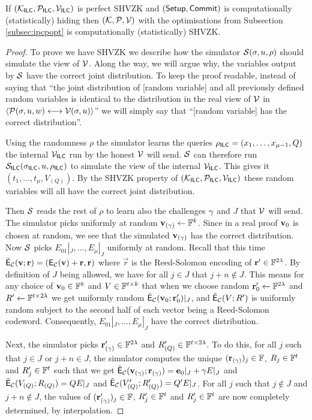\begin{theorem}[SHVZK]
If $(\mathcal{K}_{\mathsf{ILC}},\mathcal{P}_{\mathsf{ILC}},\mathcal{V}_{\mathsf{ILC}})$ is perfect SHVZK 
and $(\mathsf{Setup},\mathsf{Commit})$ is computationally (statistically) hiding then $(\mathcal{K},\mathcal{P},\mathcal{V})$ with the optimisations from Subsection \ref{subsec:ipcpopt} is computationally (statistically) SHVZK.
\end{theorem}
\begin{proof}
To prove we have SHVZK we describe how the simulator $\mathcal{S}(\mathsf{\sigma},u,\rho)$ should simulate the view of $\mathcal{V}$. Along the way, we will argue why, the variables output by $\mathcal{S}$ have the correct joint distribution. To keep the proof readable, instead of saying that ``the joint distribution of [random variable] and all previously defined random variables is identical to the distribution in the real view of $\mathcal{V}$ in $\langle \mathcal{P}(\mathsf{\sigma},u,w)\longleftrightarrow \mathcal{V}(\mathsf{\sigma},u)\rangle$'' we will simply say that ``[random variable] has the correct distribution''.

Using the randomness $\rho$ the simulator learns the queries $\rho_{\mathsf{ILC}}=(x_1,\ldots,x_{\mu-1},Q)$ the internal $\mathcal{V}_{\mathsf{ILC}}$ run by the honest $\mathcal{V}$ will send. $\mathcal{S}$ can therefore run $\mathcal{S}_{\mathsf{ILC}}(\mathsf{\sigma}_{\mathsf{ILC}},u,\rho_{\mathsf{ILC}})$ to simulate the view of the internal $\mathcal{V}_{\mathsf{ILC}}$. This gives it $(t_1,\ldots,t_\mu,V_{(Q)})$. By the SHVZK property of $(\mathcal{K}_{\mathsf{ILC}},\mathcal{P}_{\mathsf{ILC}},\mathcal{V}_{\mathsf{ILC}})$ these random variables will all have the correct joint distribution. 

Then $\mathcal{S}$ reads the rest of $\rho$ to learn also the challenges ${\mathbf{\gamma}}$ and $J$ that $\mathcal{V}$ will send. The simulator picks uniformly at random ${\mathbf{v}}_{(\mathbf{\gamma})}\gets \mathbb{F}^{k}$. Since in a real proof ${\mathbf{v}}_0$ is chosen at random, we see that the simulated ${\mathbf{v}}_{(\mathbf{\gamma})}$ has the correct distribution. Now $\mathcal{S}$ picks $E_{01}|_J,\ldots,E_{\mu}|_J$ uniformly at random. Recall that this time $\tilde{\mathsf{E}}_{\mathcal{C}}({\mathbf{v}};\mathbf{r})=(\mathsf{E}_{\mathcal{C}}({\mathbf{v}})+\mathbf{r},\mathbf{r})$ where $\vec{r}$ is the Reed-Solomon encoding of $\mathbf{r}' \in \mathbb{F}^{2\lambda}$. By definition of $J$ being allowed, we have for all $j\in J$ that $j+n\notin J$. This means for any choice of ${\mathbf{v}}_0\in \mathbb{F}^{k}$ and $V\in \mathbb{F}^{t\times k}$ that when we choose random $\mathbf{r}'_0\gets \mathbb{F}^{2\lambda}$ and $R' \gets \mathbb{F}^{t\times 2\lambda}$ we get uniformly random $\tilde{\mathsf{E}}_{\mathcal{C}}({\mathbf{v}}_0;\mathbf{r}'_0)|_J$, and $\tilde{\mathsf{E}}_{\mathcal{C}}(V;R')$ is uniformly random subject to the second half of each vector being a Reed-Solomon codeword. Consequently, $E_{01}|_J,\ldots,E_{\mu}|_J$ have the correct distribution.

Next, the simulator picks $\mathbf{r}'_{(\mathbf{\gamma})}\in \mathbb{F}^{2\lambda}$ and $R'_{(Q)}\in \mathbb{F}^{t\times 2\lambda}$. %
To do this, for all $j$ such that $j\in J$ or $j+n\in J$, the simulator computes the unique $(\mathbf{r}_{(\mathbf{\gamma})})_j\in \mathbb{F}$, $R_j\in \mathbb{F}^t$ and $R'_j\in \mathbb{F}^t$ such that we get $\tilde{\mathsf{E}}_{\mathcal{C}}({\mathbf{v}}_{(\mathbf{\gamma})};\mathbf{r}_{(\mathbf{\gamma})})=\mathbf{e}_0|_J+{\mathbf{\gamma}} E|_J$ and $\tilde{\mathsf{E}}_{\mathcal{C}}(V_{(Q)};R_{(Q)})=QE|_J$ and $\tilde{\mathsf{E}}_{\mathcal{C}}(V'_{(Q)};R'_{(Q)})=Q'E|_J$. For all $j$ such that $j\notin J$ and $j+n\notin J$, the values of $(\mathbf{r}'_{(\mathbf{\gamma})})_j\in \mathbb{F}$, $R'_j\in \mathbb{F}^t$ and $R'_j\in \mathbb{F}^t$ are now completely determined, by interpolation.


\end{proof}
